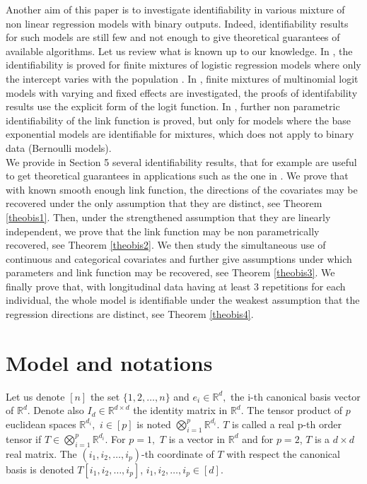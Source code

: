 Another aim of this paper is to investigate identifiability in various mixture of non linear regression models with binary outputs. 
Indeed,  identifiability results for such models are still few and  not enough to give theoretical guarantees of available algorithms. Let us review what is known up to our knowledge. In \cite{MR1108557}, the identifiability is proved for  finite mixtures of logistic regression models where only the intercept varies with the population 
\cite{MR3244553}. In \cite{MR2476114}, finite mixtures of multinomial logit models with varying and fixed effects are investigated, the proofs of identifability results use the explicit form of the logit function. In \cite{MR3244553}, further non parametric identifiability of the link function is proved, but only for models where the base exponential models are identifiable for mixtures, which does not apply to binary data (Bernoulli models).\\

We provide in Section 5 several identifiability results, that for example are useful to get theoretical guarantees in applications such as the one in \cite{MR3086415}.
We prove that with known  smooth enough link function, the directions of the covariates may be recovered under the only assumption that they are distinct, see Theorem \ref{theobis1}. Then, under the strengthened assumption that they are linearly independent, we prove that the link function may be non parametrically recovered, see Theorem \ref{theobis2}. We then study the simultaneous use of continuous and categorical covariates and further give assumptions under which parameters and link function may be recovered, see Theorem \ref{theobis3}. We finally prove that, with longitudinal data having at least $3$ repetitions for each individual, the whole model is identifiable under the weakest assumption that the regression directions are distinct, see 
Theorem \ref{theobis4}.


\section{Model and notations}

Let us denote $[n]$ the set $\lbrace 1,2,\ldots,n\rbrace$ and $e_i\in\mathbb{R}^d,$ the i-th canonical basis vector of $\mathbb{R}^d.$ Denote also $I_d\in\mathbb{R}^{d\times d}$ the identity matrix in $\mathbb{R}^{d}$. The tensor product of $p$ euclidean spaces $\mathbb{R}^{d_i},\,\,i\in [p]$ is noted $\bigotimes_{i=1}^p\mathbb{R}^{d_i}.$ $T$ is called a real p-th order tensor if $T\in \bigotimes_{i=1}^p\mathbb{R}^{d_i}.$ For $p=1,$ $T$ is a vector in $\mathbb{R}^d$ and for $p=2$, $T$ is a $d\times d$ real matrix. The $(i_1,i_2,\ldots,i_p)$-th coordinate of $T$ with respect the canonical basis is denoted   $T[i_1,i_2,\ldots,i_p]$, $ i_1,i_2,\ldots,i_p\in [d].$\\

